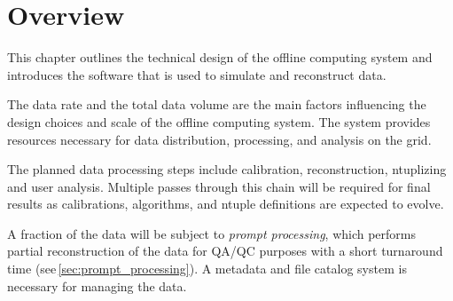 \section{Overview}

This chapter outlines the technical design of the offline computing system and introduces the software
that is used to simulate and reconstruct data.

The data rate and the total data volume are the main factors influencing the design choices and scale of the offline computing system.   The system provides resources necessary for data distribution, processing, and analysis on the grid\cite{data_managm_sys}.  

The planned data processing steps include  
calibration, reconstruction, ntuplizing and user analysis.
Multiple passes through this chain will be required for final results as
calibrations, algorithms, and ntuple definitions are expected to evolve.

A fraction of the data will be subject to \textit{prompt processing}, which performs partial reconstruction of the data for QA/QC purposes
with a short turnaround time (see\,\ref{sec:prompt_processing}). 
 A metadata and file catalog system is necessary for managing the data.
